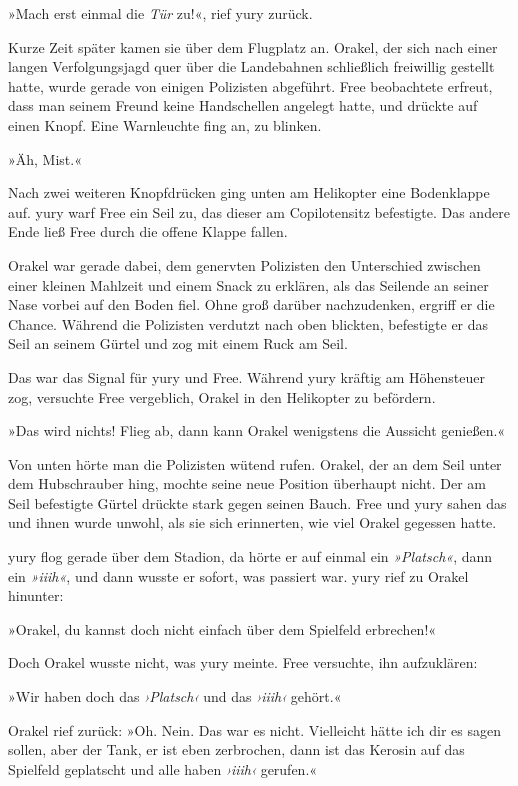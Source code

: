 »Mach erst einmal die \emph{Tür} zu!«, rief yury zurück.

Kurze Zeit später kamen sie über dem Flugplatz an. Orakel, der sich nach einer langen Verfolgungsjagd quer über die Landebahnen schließlich freiwillig gestellt hatte, wurde gerade von einigen Polizisten abgeführt. Free beobachtete erfreut, dass man seinem Freund keine Handschellen angelegt hatte, und drückte auf einen Knopf. Eine Warnleuchte fing an, zu blinken. %

»Äh, Mist.«

Nach zwei weiteren Knopfdrücken ging unten am Helikopter eine Bodenklappe auf. yury warf Free ein Seil zu, das dieser am Copilotensitz befestigte. Das andere Ende ließ Free durch die offene Klappe fallen.

Orakel war gerade dabei, dem genervten Polizisten den Unterschied zwischen einer kleinen Mahlzeit und einem Snack zu erklären, als das Seilende an seiner Nase vorbei auf den Boden fiel. Ohne groß darüber nachzudenken, ergriff er die Chance. Während die Polizisten verdutzt nach oben blickten, befestigte er das Seil an seinem Gürtel und zog mit einem Ruck am Seil.

Das war das Signal für yury und Free. Während yury kräftig am Höhensteuer zog, versuchte Free vergeblich, Orakel in den Helikopter zu befördern.

»Das wird nichts! Flieg ab, dann kann Orakel wenigstens die Aussicht genießen.«

Von unten hörte man die Polizisten wütend rufen. Orakel, der an dem Seil unter dem Hubschrauber hing, mochte seine neue Position überhaupt nicht. Der am Seil befestigte Gürtel drückte stark gegen seinen Bauch. Free und yury sahen das und ihnen wurde unwohl, als sie sich erinnerten, wie viel Orakel gegessen hatte.

yury flog gerade über dem Stadion, da hörte er auf einmal ein \textit{»Platsch«}, dann ein \textit{»iiih«}, und dann wusste er sofort, was passiert war. yury rief zu Orakel hinunter:

»Orakel, du kannst doch nicht einfach über dem Spielfeld erbrechen!«

Doch Orakel wusste nicht, was yury meinte. Free versuchte, ihn aufzuklären:

»Wir haben doch das \textit{›Platsch‹} und das \textit{›iiih‹} gehört.«

Orakel rief zurück: »Oh. Nein. Das war es nicht. Vielleicht hätte ich dir es sagen sollen, aber der Tank, er ist eben zerbrochen, dann ist das Kerosin auf das Spielfeld geplatscht und alle haben \textit{›iiih‹} gerufen.«

